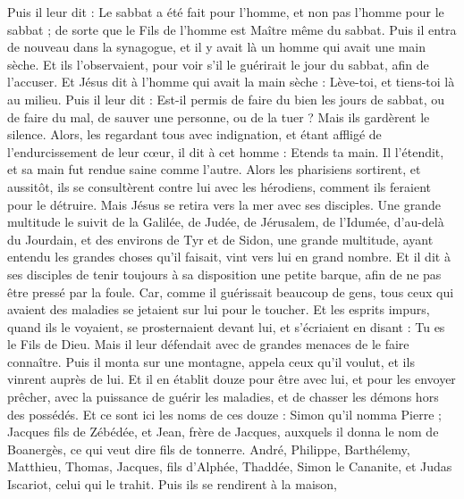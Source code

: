 \begin{multicols}{2}
Puis il leur dit : Le sabbat a été fait pour l'homme, et non pas l'homme pour le sabbat ;
de sorte que le Fils de l'homme est Maître même du sabbat.
\VerseOne{}Puis il entra de nouveau dans la synagogue, et il y avait là un homme qui avait une main sèche.
Et ils l'observaient, pour voir s'il le guérirait le jour du sabbat, afin de l'accuser.
Et Jésus dit à l'homme qui avait la main sèche : Lève-toi, et tiens-toi là au milieu.
Puis il leur dit : Est-il permis de faire du bien les jours de sabbat, ou de faire du mal, de sauver une personne, ou de la tuer ? Mais ils gardèrent le silence.
Alors, les regardant tous avec indignation, et étant affligé de l'endurcissement de leur cœur, il dit à cet homme : Etends ta main. Il l'étendit, et sa main fut rendue saine comme l'autre.
Alors les pharisiens sortirent, et aussitôt, ils se consultèrent contre lui avec les hérodiens, comment ils feraient pour le détruire.
Mais Jésus se retira vers la mer avec ses disciples. Une grande multitude le suivit de la Galilée,
de Judée, de Jérusalem, de l’Idumée, d’au-delà du Jourdain, et des environs de Tyr et de Sidon, une grande multitude, ayant entendu les grandes choses qu'il faisait, vint vers lui en grand nombre.
Et il dit à ses disciples de tenir toujours à sa disposition une petite barque, afin de ne pas être pressé par la foule.
Car, comme il guérissait beaucoup de gens, tous ceux qui avaient des maladies se jetaient sur lui pour le toucher.
Et les esprits impurs, quand ils le voyaient, se prosternaient devant lui, et s'écriaient en disant : Tu es le Fils de Dieu.
Mais il leur défendait avec de grandes menaces de le faire connaître.
Puis il monta sur une montagne, appela ceux qu'il voulut, et ils vinrent auprès de lui.
Et il en établit douze pour être avec lui,
et pour les envoyer prêcher, avec la puissance de guérir les maladies, et de chasser les démons hors des possédés.
Et ce sont ici les noms de ces douze : Simon qu'il nomma Pierre ;
Jacques fils de Zébédée, et Jean, frère de Jacques, auxquels il donna le nom de Boanergès, ce qui veut dire fils de tonnerre.
André, Philippe, Barthélemy, Matthieu, Thomas, Jacques, fils d'Alphée, Thaddée, Simon le Cananite,
et Judas Iscariot, celui qui le trahit. Puis ils se rendirent à la maison,

\end{multicols}
